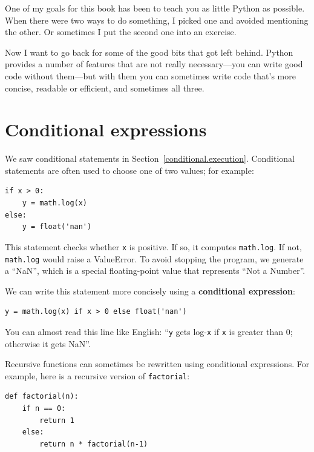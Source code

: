 \documentclass[10pt]{book}
\begin{document}
One of my goals for this book has been to teach you as little Python
as possible.  When there were two ways to do something, I picked
one and avoided mentioning the other.  Or sometimes I put the second
one into an exercise.

Now I want to go back for some of the good bits that got left behind.
Python provides a number of features that are not really necessary---you
can write good code without them---but with them you can sometimes
write code that's more concise, readable or efficient, and sometimes
all three.


\section{Conditional expressions}

We saw conditional statements in Section~\ref{conditional.execution}.
Conditional statements are often used to choose one of two values;
for example:

\begin{verbatim}
if x > 0:
    y = math.log(x)
else:
    y = float('nan')
\end{verbatim}

This statement checks whether {\tt x} is positive.  If so, it computes
{\tt math.log}.  If not, {\tt math.log} would raise a ValueError.  To
avoid stopping the program, we generate a ``NaN'', which is a special
floating-point value that represents ``Not a Number''.

We can write this statement more concisely using a {\bf conditional
expression}:

\begin{verbatim}
y = math.log(x) if x > 0 else float('nan')
\end{verbatim}

You can almost read this line like English: ``{\tt y} gets log-{\tt x}
if {\tt x} is greater than 0; otherwise it gets NaN''.

Recursive functions can sometimes be rewritten using conditional
expressions.  For example, here is a recursive version of {\tt factorial}:

\begin{verbatim}
def factorial(n):
    if n == 0:
        return 1
    else:
        return n * factorial(n-1)
\end{verbatim}
\end{document}

